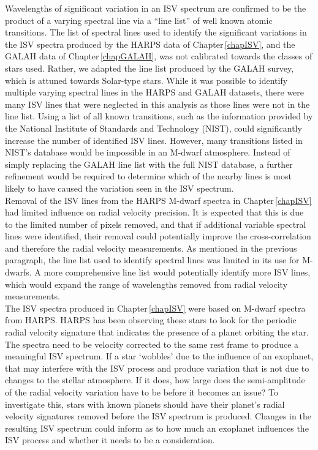 Wavelengths of significant variation in an ISV spectrum are confirmed to be the product of a varying spectral line via a ``line list'' of well known atomic transitions. The list of spectral lines used to identify the significant variations in the ISV spectra produced by the HARPS data of Chapter\,\ref{chapISV}, and the GALAH data of Chapter\,\ref{chapGALAH}, was not calibrated towards the classes of stars used. Rather, we adapted the line list produced by the GALAH survey, which is attuned towards Solar-type stars. While it was possible to identify multiple varying spectral lines in the HARPS and GALAH datasets, there were many ISV lines that were neglected in this analysis as those lines were not in the line list. Using a list of all known transitions, such as the information provided by the National Institute of Standards and Technology (NIST), could significantly increase the number of identified ISV lines. However, many transitions listed in NIST's database would be impossible in an M-dwarf atmosphere. Instead of simply replacing the GALAH line list with the full NIST database, a further refinement would be required to determine which of the nearby lines is most likely to have caused the variation seen in the ISV spectrum.\\

Removal of the ISV lines from the HARPS M-dwarf spectra in Chapter\,\ref{chapISV} had limited influence on radial velocity precision. It is expected that this is due to the limited number of pixels removed, and that if additional variable spectral lines were identified, their removal could potentially improve the cross-correlation and therefore the radial velocity measurements. As mentioned in the previous paragraph, the line list used to identify spectral lines was limited in its use for M-dwarfs. A more comprehensive line list would potentially identify more ISV lines, which would expand the range of wavelengths removed from radial velocity measurements.\\

The ISV spectra produced in Chapter\,\ref{chapISV} were based on M-dwarf spectra from HARPS. HARPS has been observing these stars to look for the periodic radial velocity signature that indicates the presence of a planet orbiting the star. The spectra need to be velocity corrected to the same rest frame to produce a meaningful ISV spectrum. If a star `wobbles' due to the influence of an exoplanet, that may interfere with the ISV process and produce variation that is not due to changes to the stellar atmosphere. If it does, how large does the semi-amplitude of the radial velocity variation have to be before it becomes an issue? To investigate this, stars with known planets should have their planet's radial velocity signatures removed before the ISV spectrum is produced. Changes in the resulting ISV spectrum could inform as to how much an exoplanet influences the ISV process and whether it needs to be a consideration.\\

